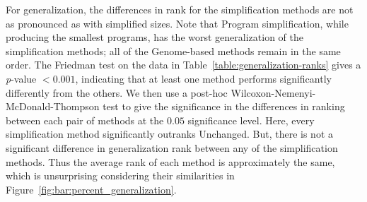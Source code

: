 For generalization, the differences in rank for the simplification methods are not as pronounced as with simplified sizes. Note that Program simplification, while producing the smallest programs, has the worst generalization of the simplification methods; all of the Genome-based methods remain in the same order. The Friedman test on the data in Table~\ref{table:generalization-ranks} gives a \textit{p}-value $< 0.001$, indicating that at least one method performs significantly differently from the others. We then use a post-hoc Wilcoxon-Nemenyi-McDonald-Thompson test \cite{hollander1999nonparametric} to give the significance in the differences in ranking between each pair of methods at the $0.05$ significance level. Here, every simplification method significantly outranks Unchanged. But, there is not a significant difference in generalization rank between any of the simplification methods. Thus the average rank of each method is approximately the same, which is unsurprising considering their similarities in Figure~\ref{fig:bar:percent_generalization}.



